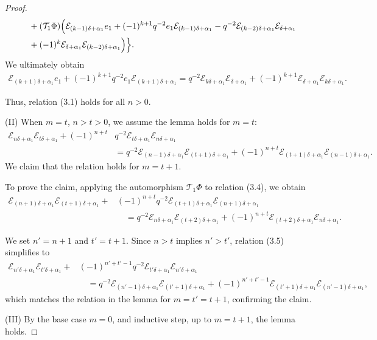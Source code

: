 \documentclass[10pt,a4paper]{amsart}
\begin{document}
\begin{proof}
\begin{align*}
&\quad+(\mathcal{T}_1\Phi)\Bigl(\mathcal{E}_{(k-1)\delta+\alpha_{1}}e_1+(-1)^{k+1}q^{-2}e_1\mathcal{E}_{(k-1)\delta+\alpha_{1}}-q^{-2}\mathcal{E}_{(k-2)\delta+\alpha_{1}}\mathcal{E}_{\delta+\alpha_{1}}\\ 
&\quad+(-1)^{k}\mathcal{E}_{\delta+\alpha_{1}}\mathcal{E}_{(k-2)\delta+\alpha_{1}}\Bigr)\Bigr\}.
\end{align*}
We ultimately obtain  
\begin{align*}
\mathcal{E}_{(k+1)\delta+\alpha_{1}}e_{1}+(-1)^{k+1}q^{-2}e_{1}\mathcal{E}_{(k+1)\delta+\alpha_{1}}
=q^{-2}\mathcal{E}_{k\delta+\alpha_{1}}\mathcal{E}_{\delta+\alpha_{1}}+(-1)^{k+1}\mathcal{E}_{\delta+\alpha_{1}}\mathcal{E}_{k\delta+\alpha_{1}}.
\end{align*}

Thus, relation (3.1) holds for all \(n > 0\).

(II) When \(m=t\), \(n>t>0\), we assume the lemma holds for \(m=t\):
\begin{align}
\mathcal{E}_{n\delta+\alpha_1} \mathcal{E}_{t\delta+\alpha_1} + (-1)^{n+t}& q^{-2} \mathcal{E}_{t\delta+\alpha_1} \mathcal{E}_{n\delta+\alpha_1} \nonumber\\
&= q^{-2} \mathcal{E}_{(n-1)\delta+\alpha_1} \mathcal{E}_{(t+1)\delta+\alpha_1} + (-1)^{n+t} \mathcal{E}_{(t+1)\delta+\alpha_1} \mathcal{E}_{(n-1)\delta+\alpha_1}.
\end{align}
We claim that the relation holds for \(m=t+1\).

To prove the claim, applying the automorphism \(\mathcal{T}_1\Phi\) to relation (3.4), we obtain
\begin{align}
\mathcal{E}_{(n+1)\delta+\alpha_1} \mathcal{E}_{(t+1)\delta+\alpha_1} + &(-1)^{n+t}q^{-2} \mathcal{E}_{(t+1)\delta+\alpha_1} \mathcal{E}_{(n+1)\delta+\alpha_1} \nonumber\\
&\quad = q^{-2} \mathcal{E}_{n\delta+\alpha_1}\mathcal{E}_{(t+2)\delta+\alpha_1} + (-1)^{n+t} \mathcal{E}_{(t+2)\delta+\alpha_1} \mathcal{E}_{n\delta+\alpha_1}.
\end{align}

We set \(n' = n+1\) and \(t' = t+1\). Since \(n > t\) implies \(n' > t'\), relation (3.5) simplifies to
\[
\begin{aligned}
\mathcal{E}_{n'\delta+\alpha_1} \mathcal{E}_{t'\delta+\alpha_1} + &(-1)^{n'+t'-1} q^{-2} \mathcal{E}_{t'\delta+\alpha_1} \mathcal{E}_{n'\delta+\alpha_1} \\
&\quad = q^{-2} \mathcal{E}_{(n'-1)\delta+\alpha_1} \mathcal{E}_{(t'+1)\delta+\alpha_1} + (-1)^{n'+t'-1} \mathcal{E}_{(t'+1)\delta+\alpha_1} \mathcal{E}_{(n'-1)\delta+\alpha_1},
\end{aligned}
\]
which matches the relation in the lemma for \(m = t' = t+1\), confirming the claim.

(III)
By the base case \(m = 0\), and inductive step, up to \(m = t+1\), the lemma holds.
\end{proof}
\end{document}
